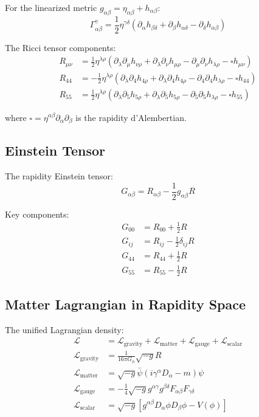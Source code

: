 \documentclass[12pt,a4paper]{article}
\begin{document}
For the linearized metric $g_{\alpha\beta} = \eta_{\alpha\beta} + h_{\alpha\beta}$:
\begin{equation}
\Gamma^\gamma_{\alpha\beta} = \frac{1}{2} \eta^{\gamma\delta} (\partial_\alpha h_{\beta\delta} + \partial_\beta h_{\alpha\delta} - \partial_\delta h_{\alpha\beta})
\end{equation}

The Ricci tensor components:
\begin{align}
R_{\mu\nu} &= \frac{1}{2} \eta^{\lambda\rho} (\partial_\lambda\partial_\mu h_{\nu\rho} + \partial_\lambda\partial_\nu h_{\mu\rho} - \partial_\mu\partial_\nu h_{\lambda\rho} - \square h_{\mu\nu}) \\
R_{44} &= -\frac{1}{2} \eta^{\lambda\rho} (\partial_\lambda\partial_4 h_{4\rho} + \partial_\lambda\partial_4 h_{4\rho} - \partial_4\partial_4 h_{\lambda\rho} - \square h_{44}) \\
R_{55} &= \frac{1}{2} \eta^{\lambda\rho} (\partial_\lambda\partial_5 h_{5\rho} + \partial_\lambda\partial_5 h_{5\rho} - \partial_5\partial_5 h_{\lambda\rho} - \square h_{55})
\end{align}

where $\square = \eta^{\alpha\beta} \partial_\alpha \partial_\beta$ is the rapidity d'Alembertian.

\subsection{Einstein Tensor}

The rapidity Einstein tensor:
\begin{equation}
G_{\alpha\beta} = R_{\alpha\beta} - \frac{1}{2} g_{\alpha\beta} R
\end{equation}

Key components:
\begin{align}
G_{00} &= R_{00} + \frac{1}{2} R \\
G_{ij} &= R_{ij} - \frac{1}{2} \delta_{ij} R \\
G_{44} &= R_{44} + \frac{1}{2} R \\
G_{55} &= R_{55} - \frac{1}{2} R
\end{align}

\subsection{Matter Lagrangian in Rapidity Space}

The unified Lagrangian density:
\begin{align}
\mathcal{L} &= \mathcal{L}_{\text{gravity}} + \mathcal{L}_{\text{matter}} + \mathcal{L}_{\text{gauge}} + \mathcal{L}_{\text{scalar}} \\
\mathcal{L}_{\text{gravity}} &= \frac{1}{16\pi G_\phi} \sqrt{-g} R \\
\mathcal{L}_{\text{matter}} &= \sqrt{-g} \bar{\psi} (i\gamma^\alpha D_\alpha - m) \psi \\
\mathcal{L}_{\text{gauge}} &= -\frac{1}{4} \sqrt{-g} g^{\alpha\gamma} g^{\beta\delta} F_{\alpha\beta} F_{\gamma\delta} \\
\mathcal{L}_{\text{scalar}} &= \sqrt{-g} \left[ g^{\alpha\beta} D_\alpha \phi D_\beta \phi - V(\phi) \right]
\end{align}
\end{document}
